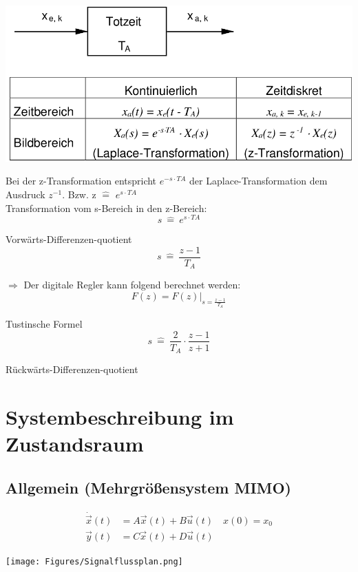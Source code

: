 \documentclass[10pt,a4paper]{article}
\begin{document}
\includegraphics[width=0.9\columnwidth]{Figures/zTrans.png}

Bei der z-Transformation entspricht $e^{-s \cdot TA}$ der
Laplace-Transformation dem Ausdruck $z^{-1}$. Bzw. z $\hat{=}$ $e^{s \cdot
			TA}$\\ Transformation vom s-Bereich in den z-Bereich:
\[
	s \ \hat{=}\  e^{s \cdot TA}
\]

Vorwärts-Differenzen-quotient
\[
	s \ \hat{=} \ \frac{z-1}{T_A}
\]

$\Rightarrow$ Der digitale Regler kann folgend berechnet werden:
\[
	F(z) = F(z)|_{s= \frac {z-1}{T_A}}
\]

Tustinsche Formel
\[
	s \ \hat{=} \ \frac{2}{T_A} \cdot \frac{z-1}{z+1}
\]

Rückwärts-Differenzen-quotient

\section{Systembeschreibung im Zustandsraum}
\subsection{Allgemein (Mehrgrößensystem MIMO) }
\begin{mdframed}[style=exercise]
	\vspace{-1em}
	\begin{align*}
		\dot{\Vec{x}}(t) & = A\vec{x}(t) + B\vec{u}(t) \quad x(0) = x_{0} \\
		\vec{y}(t)       & = C\vec{x}(t) + D\vec{u}(t)
	\end{align*}
\end{mdframed}

\begin{center}
	\texttt{[image: Figures/Signalflussplan.png]}
\end{center}
\end{document}
